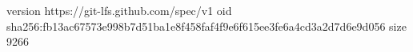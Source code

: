 version https://git-lfs.github.com/spec/v1
oid sha256:fb13ac67573e998b7d51ba1e8f458faf4f9e6f615ee3fe6a4cd3a2d7d6e9d056
size 9266
